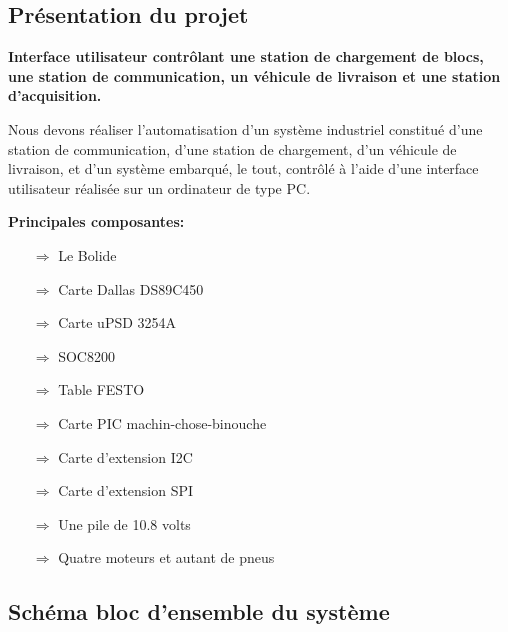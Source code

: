 \documentclass[10pt,a4paper,final]{article}
\begin{document}
\renewcommand\footrulewidth{1pt}
\fancyfoot[R]{\today}
\begin{spacing}{1.5}

\section{Présentation du projet}
\begin{center}
\textbf{Interface utilisateur contrôlant une station de chargement de blocs, une station de communication, un véhicule de livraison et une station d'acquisition.}
\end{center}

Nous devons réaliser l'automatisation d'un système industriel constitué d'une station de communication, d'une station de chargement, d'un véhicule de livraison, et d'un système embarqué, le tout, contrôlé à l'aide d'une interface utilisateur réalisée sur un ordinateur de type PC. \\

\bigskip

\begin{flushleft}
\textbf{Principales composantes:}
\end{flushleft}


\begin{itemize}
\item[$\Rightarrow$] Le Bolide
\item[$\Rightarrow$] Carte Dallas DS89C450
\item[$\Rightarrow$] Carte uPSD 3254A
\item[$\Rightarrow$] SOC8200
\item[$\Rightarrow$] Table FESTO
\item[$\Rightarrow$] Carte PIC machin-chose-binouche
\item[$\Rightarrow$] Carte d'extension I{\small 2}C
\item[$\Rightarrow$] Carte d'extension SPI
\item[$\Rightarrow$] Une pile de 10.8 volts
\item[$\Rightarrow$] Quatre moteurs et autant de pneus
\end{itemize}

\subsection{Schéma bloc d'ensemble du système}


\end{spacing}
\end{document}
